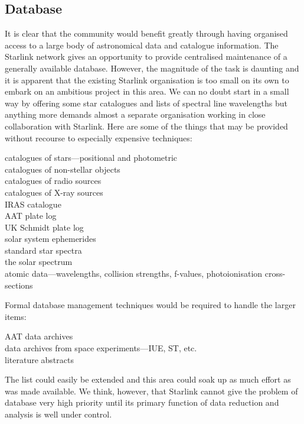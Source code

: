 \subsection {Database}
It is clear that the community would benefit greatly through having organised
access to a large body of astronomical data and catalogue information.
The Starlink network gives an opportunity to provide centralised maintenance of
a generally available database.
However, the magnitude of the task is daunting and it is apparent that the
existing Starlink organisation is too small on its own to embark on an ambitious
project in this area.
We can no doubt start in a small way by offering some star catalogues and
lists of spectral line wavelengths but anything more demands almost a separate
organisation working in close collaboration with Starlink.
Here are some of the things that may be provided without recourse to especially
expensive techniques:
\begin{description}
\item [catalogues of stars---positional and photometric]
\item [catalogues of non-stellar objects]
\item [catalogues of radio sources]
\item [catalogues of X-ray sources]
\item [IRAS catalogue]
\item [AAT plate log]
\item [UK Schmidt plate log]
\item [solar system ephemerides]
\item [standard star spectra]
\item [the solar spectrum]
\item [atomic data---wavelengths, collision strengths, f-values,
photoionisation cross-sections]
\end{description}
Formal database management techniques would be required to handle the larger
items:
\begin{description}
\item [AAT data archives]
\item [data archives from space experiments---IUE, ST, etc.]
\item [literature abstracts]
\end{description}
The list could easily be extended and this area could soak up as much effort as
was made available.
We think, however, that Starlink cannot give the problem of database very high
priority until its primary function of data reduction and analysis is well under
control.
